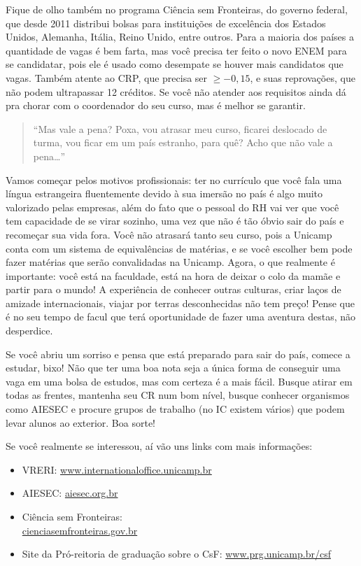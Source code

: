 Fique de olho também no programa Ciência sem Fronteiras, do governo federal, que
desde 2011 distribui bolsas para instituições de excelência dos Estados Unidos,
Alemanha, Itália, Reino Unido, entre outros. Para a maioria dos países a
quantidade de vagas é bem farta, mas você precisa ter feito o novo ENEM para se
candidatar, pois ele é usado como desempate se houver mais candidatos que
vagas. Também atente ao CRP, que precisa ser $\geq -0{,}15$, e suas reprovações,
que não podem ultrapassar 12 créditos. Se você não atender aos requisitos ainda
dá pra chorar com o coordenador do seu curso, mas é melhor se garantir.


\begin{quote}
``Mas vale a pena? Poxa, vou atrasar meu curso, ficarei deslocado de turma, vou
ficar em um país estranho, para quê? Acho que não vale a pena{\dots}''
\end{quote}
Vamos começar pelos motivos profissionais: ter no currículo que você fala uma
língua estrangeira fluentemente devido à sua imersão no país é algo muito
valorizado pelas empresas, além do fato que o pessoal do RH vai ver que você tem
capacidade de se virar sozinho, uma vez que não é tão óbvio sair do país e
recomeçar sua vida fora. Você não atrasará tanto seu curso, pois a Unicamp conta
com um sistema de equivalências de matérias, e se você escolher bem pode fazer
matérias que serão convalidadas na Unicamp. Agora, o que realmente é importante:
você está na faculdade, está na hora de deixar o colo da mamãe e partir para o
mundo! A experiência de conhecer outras culturas, criar laços de amizade
internacionais, viajar por terras desconhecidas não tem preço! Pense que é no
seu tempo de facul que terá oportunidade de fazer uma aventura destas, não
desperdice.

Se você abriu um sorriso e pensa que está preparado para sair do país, comece a
estudar, bixo! Não que ter uma boa nota seja a única forma de conseguir uma vaga
em uma bolsa de estudos, mas com certeza é a mais fácil.  Busque atirar em todas
as frentes, mantenha seu CR num bom nível, busque conhecer organismos como
AIESEC e procure grupos de trabalho (no IC existem vários) que podem levar
alunos ao exterior. Boa sorte!

Se você realmente se interessou, aí vão uns links com mais informações:

\begin{itemize}
    \item  VRERI: \url{www.internationaloffice.unicamp.br}
    \item  AIESEC: \url{aiesec.org.br}
    \item  Ciência sem Fronteiras: \\\url{cienciasemfronteiras.gov.br}
    \item  Site da Pró-reitoria de graduação sobre o CsF: \url{www.prg.unicamp.br/csf}
\end{itemize}

